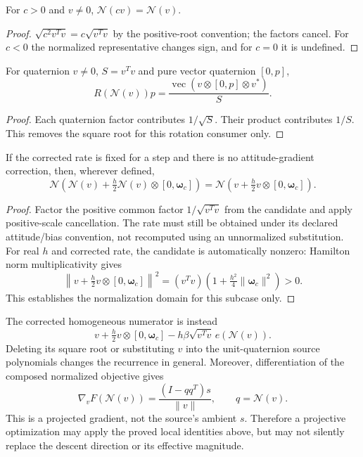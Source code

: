 \begin{proposition}
For $c>0$ and $v\ne0$, $\mathcal N(cv)=\mathcal N(v)$.
\end{proposition}
\begin{proof}
$\sqrt{c^2v^Tv}=c\sqrt{v^Tv}$ by the positive-root convention; the factors cancel.
For $c<0$ the normalized representative changes sign, and for $c=0$ it is undefined.
\end{proof}

\begin{proposition}
For quaternion $v\ne0$, $S=v^Tv$ and pure vector quaternion $[0,p]$,
\[
R(\mathcal N(v))p=\frac{\operatorname{vec}(v\otimes[0,p]\otimes v^*)}{S}.
\]
\end{proposition}
\begin{proof}
Each quaternion factor contributes $1/\sqrt S$. Their product contributes
$1/S$. This removes the square root for this rotation consumer only.
\end{proof}

\begin{proposition}
If the corrected rate is fixed for a step and there is no attitude-gradient
correction, then, wherever defined,
\[
\mathcal N\!\left(\mathcal N(v)+\tfrac h2\mathcal N(v)
 \otimes[0,\boldsymbol\omega_c]\right)
=\mathcal N\!\left(v+\tfrac h2v\otimes[0,\boldsymbol\omega_c]\right).
\]
\end{proposition}
\begin{proof}
Factor the positive common factor $1/\sqrt{v^Tv}$ from the candidate and apply
positive-scale cancellation. The rate must still be obtained under its declared
attitude/bias convention, not recomputed using an unnormalized substitution.
For real $h$ and corrected rate, the candidate is automatically nonzero:
Hamilton norm multiplicativity gives
\[
 \left\|v+\tfrac h2v\otimes[0,\boldsymbol\omega_c]\right\|^2
 =(v^Tv)\left(1+\tfrac{h^2}{4}\|\boldsymbol\omega_c\|^2\right)>0.
\]
This establishes the normalization domain for this subcase only.
\end{proof}

The corrected homogeneous numerator is instead
\[
v+\tfrac h2v\otimes[0,\boldsymbol\omega_c]
 -h\beta\sqrt{v^Tv}\,e(\mathcal N(v)).
\]
Deleting its square root or substituting $v$ into the unit-quaternion source
polynomials changes the recurrence in general. Moreover, differentiation of the
composed normalized objective gives
\[
\nabla_v F(\mathcal N(v))
=\frac{(I-qq^T)s}{\|v\|},\qquad q=\mathcal N(v).
\]
This is a projected gradient, not the source's ambient $s$. Therefore a
projective optimization may apply the proved local identities above, but may
not silently replace the descent direction or its effective magnitude.

